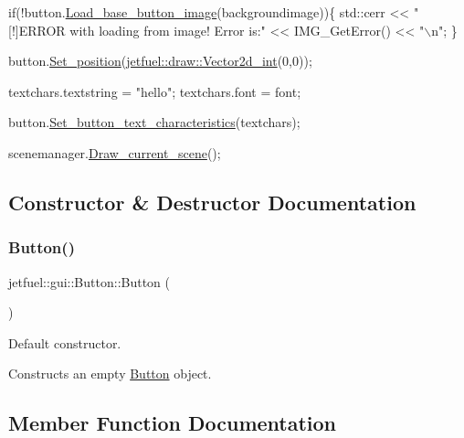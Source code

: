 \begin{DoxyCode}
\textcolor{keywordflow}{if}(!button.\hyperlink{classjetfuel_1_1gui_1_1Button_a2c9b05aeec9661440c2bde16c6bdd791}{Load\_base\_button\_image}(backgroundimage))\{
    std::cerr << \textcolor{stringliteral}{"[!]ERROR with loading from image! Error is:"} <<
    IMG\_GetError() << \textcolor{stringliteral}{"\(\backslash\)n"};
\}

button.\hyperlink{classjetfuel_1_1gui_1_1Button_a642d3f1412339c826458b80dce76ef34}{Set\_position}(\hyperlink{classjetfuel_1_1draw_1_1Vector2d}{jetfuel::draw::Vector2d\_int}(0,0));

textchars.textstring = \textcolor{stringliteral}{"hello"};
textchars.font = font;

button.\hyperlink{classjetfuel_1_1gui_1_1Button_ab2cf5dbf928df48a55118652e003519a}{Set\_button\_text\_characteristics}(textchars);

scenemanager.\hyperlink{classjetfuel_1_1draw_1_1Scene__manager_a8af9a3abfd5121b1b8556342de435773}{Draw\_current\_scene}();
\end{DoxyCode}
 

\subsection{Constructor \& Destructor Documentation}
\mbox{\label{classjetfuel_1_1gui_1_1Button_ad9fc0a1426f1fe03563ebac1c4ffcd92}} 
\subsubsection{\texorpdfstring{Button()}{Button()}}
{\footnotesize\ttfamily jetfuel\+::gui\+::\+Button\+::\+Button (\begin{DoxyParamCaption}{ }\end{DoxyParamCaption})\hspace{0.3cm}{\ttfamily [inline]}}



Default constructor. 

Constructs an empty \hyperlink{classjetfuel_1_1gui_1_1Button}{Button} object. 

\subsection{Member Function Documentation}
\mbox{\label{classjetfuel_1_1gui_1_1Button_aa566a1d59623fde8d062c3d02b6fd5f4}} 
